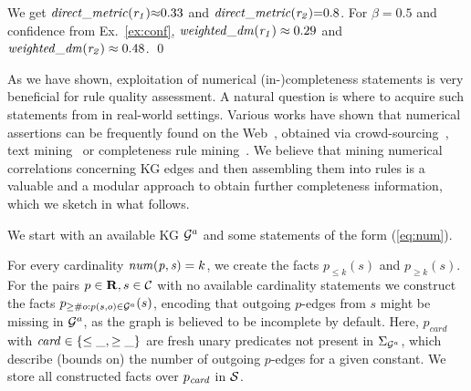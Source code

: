 \begin{example}
We get $\mathit{direct\_metric(r_1)}{\approx} 0.33$ and $\mathit{direct\_metric(r_2)}{=}0.8$. %
For $\beta=0.5$ and %
confidence from Ex.~\ref{ex:conf}, %
$\mathit{weighted\_dm(r_1)} \approx 0.29$ and $\mathit{weighted\_dm(r_2)} \approx 0.48$. \qed
\end{example}

\label{sec:acquisition-numerical}
As we have shown, exploitation of numerical (in-)completeness statements is very beneficial for rule quality assessment. 
A natural question is where to acquire such statements from in real-world settings.  
Various works have shown that numerical 
assertions can be 
frequently found on the Web~\cite{rdfcomp}, %
obtained via crowd-sourcing~\cite{DarariREN16}, text mining~\cite{paramita-acl-2017} or completeness rule mining~\cite{galarragapredicting}. 
We believe that mining %
numerical correlations concerning KG edges and then 
assembling %
them into rules %
is a valuable and a %
modular approach to obtain further completeness information, which we sketch in what follows. 

We start with an available KG $\mathcal{G}^a$ and some statements of the form (\ref{eq:num}).



 For every cardinality  $\mathit{num(p,s)}=k$, we create the facts $p_{\leq k}(s)$ and $p_{\geq k}(s)$. For the pairs $p\in\mathbf{R},s\in\mathcal{C}$  with no available cardinality statements we construct the facts $p_{\geq \# o: p(s,o)\in \mathcal{G}^a}(s)$,  encoding that outgoing $p$-edges from $s$ might be %
missing in $\mathcal{G}^a$, as the graph is believed to be incomplete by default.
Here, $p_{card}$ with $\mathit{card\in \{\leq \_, \geq \_\}}$ are fresh unary predicates not present in $\Sigma_{\mathcal{G}^a}$, which describe (bounds on) the number of outgoing $p$-edges for a given constant. We store all constructed facts over $p_{\mathit{card}}$ in %
$\mathcal{S}$.
 

